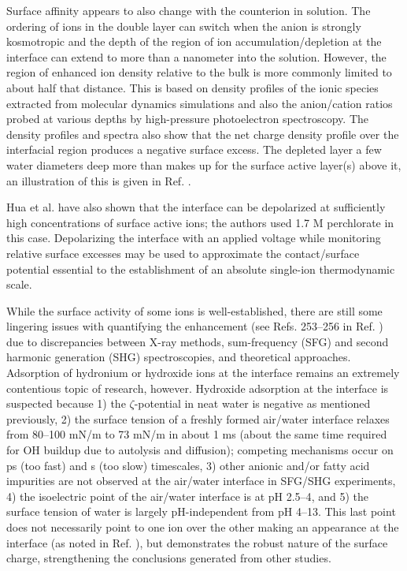 \begin{intro}
   Surface affinity appears to also change with the counterion in solution\cite{cheng2012ambient,hua2014cation,tissot2015cation}. The ordering of ions in the double layer can
   switch when the anion is strongly kosmotropic and the depth of the region of ion accumulation/depletion at the interface can extend to more than a nanometer into the solution\cite{brown2015ion}. 
   However, the region of enhanced ion density relative to the bulk is more commonly limited to about half that distance. This is based on density profiles of the ionic species 
   extracted from molecular dynamics simulations and also the anion/cation ratios probed at various depths by high-pressure photoelectron spectroscopy\cite{jungwirth2006airwat}. 
   The density profiles and spectra also show that the net charge density profile over the interfacial region produces a negative surface excess. The depleted layer a few water 
   diameters deep more than makes up for the surface active layer(s) above it, an illustration of this is given in Ref. \cite{jungwirth2006airwat}. 
   
   Hua et al. have also shown that the interface can be depolarized at sufficiently high concentrations of surface active ions; the authors used 1.7 M perchlorate in this case\cite{hua2013surface}. 
   Depolarizing the interface with an applied voltage while monitoring relative surface excesses may be used to approximate the contact/surface potential essential to the
   establishment of an absolute single-ion thermodynamic scale\cite{conboy1997shg_tatb}.

   While the surface activity of some ions is well-established, there are still some lingering issues with quantifying the enhancement (see Refs. 253--256 in Ref. \cite{bjorneholm2016water})
   due to discrepancies between X-ray methods, sum-frequency (SFG) and second harmonic generation (SHG) spectroscopies, and theoretical approaches. Adsorption of hydronium 
   or hydroxide ions at the interface remains an extremely contentious topic of research, however. Hydroxide adsorption at the interface is suspected because 1) the 
   $\zeta$-potential in neat water is negative as mentioned previously, 2) the surface tension of a freshly formed air/water interface relaxes from 80--100 mN/m to 73 mN/m 
   in about 1 ms (about the same time required for OH\sur{-} buildup due to autolysis and diffusion); competing mechanisms occur on ps (too fast) and s (too slow) timescales\cite{liu2012surface},
   3) other anionic and/or fatty acid impurities are not observed at the air/water interface in SFG/SHG experiments\cite{jena2012surface}, 4) the isoelectric point of the air/water
   interface is at pH 2.5--4\cite{beattie2014surfacid,buch2007surfacid,liu2012surface,mishra2012surfacid}, and 5) the surface tension of water is largely pH-independent from 
   pH 4--13. This last point does not necessarily point to one ion over the other making an appearance at the interface (as noted in Ref. \cite{jungwirth2015comment}), but 
   demonstrates the robust nature of the surface charge, strengthening the conclusions generated from other studies. 
   

\end{intro}
